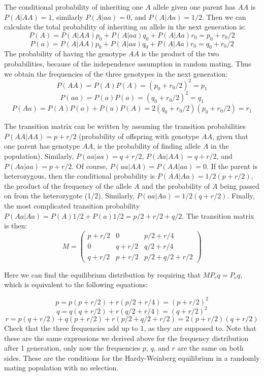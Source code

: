 \documentclass[
  letterpaper,
  DIV=11,
  numbers=noendperiod]{scrreprt}
\begin{document}
The conditional probability of inheriting one \(A\) allele given one
parent has \(AA\) is \(P (A | AA) = 1\), similarly \(P(A | aa) = 0\),
and \(P(A | Aa) = 1/2\). Then we can calculate the total probability of
inheriting an allele in the next generation is:
\[ P(A) = P (A | AA)p_0 + P(A | aa) q_0 + P(A | Aa) r_0 = p_0 + r_0/2\]
\[ P(a) = P (A | AA)p_0 + P(A | aa) q_0 + P(A | Aa) r_0 = q_0 + r_0/2\]
The probability of having the genotype \(AA\) is the product of the two
probabilities, because of the independence assumption in random mating.
Thus we obtain the frequencies of the three genotypes in the next
generation: \[P(AA) = P(A) P(A) = (p_0 + r_0/2)^2 = p_1\]
\[P(aa) = P(a) P(a) = (q_0 + r_0/2)^2 = q_1\]
\[P(Aa) = P(A) P(a) + P(a)P(A) = 2(q_0 + r_0/2)(p_0 + r_0/2) = r_1\]

The transition matrix can be written by assuming the transition
probabilities \(P(AA | AA) = p + r/2\) (probability of offspring with
genotype \(AA\), given that one parent has genotype \(AA\), is the
probability of finding allele \(A\) in the population). Similarly,
\(P(aa | aa) = q + r/2\), \(P(Aa | AA) = q + r/2\), and
\(P(Aa | aa) = p + r/2\). Of course, \(P(aa | AA ) = P(AA | aa) = 0\).
If the parent is heterozygous, then the conditional probability is
\(P(AA | Aa) = 1/2( p + r/2)\), the product of the frequency of the
allele \(A\) and the probability of \(A\) being passed on from the
heterozygote (1/2). Similarly, \(P(aa | Aa ) = 1/2( q + r/2)\). Finally,
the most complicated transition probability
\(P(Aa | Aa) = P(A) 1/2 + P(a) 1/2 = p/2 + r/2 + q/2\). The transition
matrix is then:
\[ M = \left(\begin{array}{ccc}p + r/2 & 0 & p/2 + r/4 \\0 & q + r/2 & q/2 + r/4 \\ q + r/2 &  p + r/2 & p/2 + q/2 + r/2\end{array}\right) \]

Here we can find the equilibrium distribution by requiring that
\(M P_eq = P_eq\), which is equivalent to the following equations:

\[ p = p (p + r/2) + r (p/2 + r/4) = (p + r/2)^2\]
\[ q = q(q + r/2) + r (q/2 + r/4) = (q + r/2)^2 \]
\[ r = p(q + r/2) + q(p+r/2) + r (p/2 + q/2 + r/2) = 2(p + r/2)(q + r/2) \]
Check that the three frequencies add up to 1, as they are supposed to.
Note that these are the same expressions we derived above for the
frequency distribution after 1 generation, only now the frequencies
\(p\), \(q\), and \(r\) are the same on both sides. These are the
conditions for the Hardy-Weinberg equilibrium in a randomly mating
population with no selection.
\end{document}
